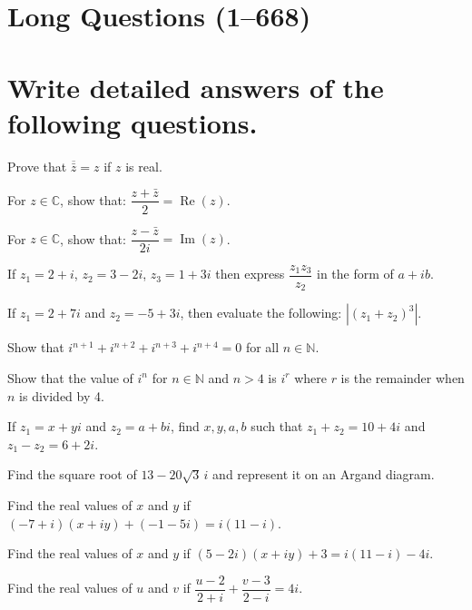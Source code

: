 \documentclass[11pt,a4paper]{article}
\begin{document}
\newpage

\section{Long Questions (1--668)}

\section*{Write detailed answers of the following questions.}

\begin{longlist}

\item Prove that $\overline{\bar{z}}=z$ if $z$ is real.

\item For $z\in\mathbb{C}$, show that: $\dfrac{z+\bar{z}}{2}=\operatorname{Re}(z)$.

\item For $z\in\mathbb{C}$, show that: $\dfrac{z-\bar{z}}{2i}=\operatorname{Im}(z)$.

\item If $z_1=2+i$, $z_2=3-2i$, $z_3=1+3i$ then express $\dfrac{z_1 z_3}{z_2}$ in the form of $a+ib$.

\item If $z_1=2+7i$ and $z_2=-5+3i$, then evaluate the following: $\left|(z_1+z_2)^3\right|$.

\item Show that $i^{n+1}+i^{n+2}+i^{n+3}+i^{n+4}=0$ for all $n\in\mathbb{N}$.

\item Show that the value of $i^n$ for $n\in\mathbb{N}$ and $n>4$ is $i^r$ where $r$ is the remainder when $n$ is divided by 4.

\item If $z_1=x+yi$ and $z_2=a+bi$, find $x,y,a,b$ such that $z_1+z_2=10+4i$ and $z_1-z_2=6+2i$.

\item Find the square root of $13-20\sqrt{3}\,i$ and represent it on an Argand diagram.

\item Find the real values of $x$ and $y$ if $(-7+i)(x+iy)+(-1-5i)=i(11-i)$.

\item Find the real values of $x$ and $y$ if $(5-2i)(x+iy)+3=i(11-i)-4i$.

\item Find the real values of $u$ and $v$ if $\dfrac{u-2}{2+i}+\dfrac{v-3}{2-i}=4i$.


\end{longlist}
\end{document}
